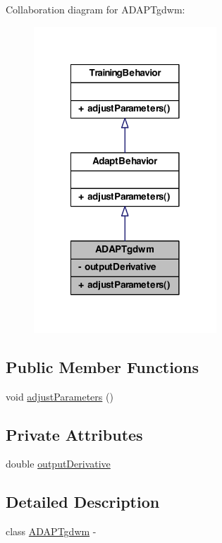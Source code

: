 Collaboration diagram for ADAPTgdwm:\nopagebreak
\begin{figure}[H]
\begin{center}
\leavevmode
\includegraphics[width=194pt]{class_a_d_a_p_tgdwm__coll__graph}
\end{center}
\end{figure}
\subsection*{Public Member Functions}
\begin{DoxyCompactItemize}
\item 
void \hyperlink{class_a_d_a_p_tgdwm_ae7aacd1009a935359982c0b78d87a990}{adjustParameters} ()
\end{DoxyCompactItemize}
\subsection*{Private Attributes}
\begin{DoxyCompactItemize}
\item 
double \hyperlink{class_a_d_a_p_tgdwm_afd8a42a97aff880c902f241e5405abf1}{outputDerivative}
\end{DoxyCompactItemize}


\subsection{Detailed Description}
class \hyperlink{class_a_d_a_p_tgdwm}{ADAPTgdwm} -\/ 

